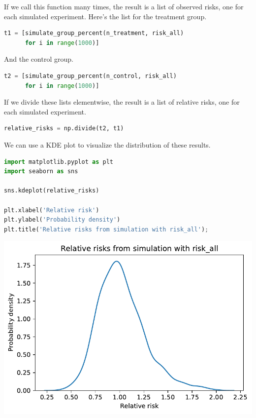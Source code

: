 If we call this function many times, the result is a list of observed
risks, one for each simulated experiment. Here's the list for the
treatment group.

\begin{lstlisting}[language=Python,style=source]
t1 = [simulate_group_percent(n_treatment, risk_all)
      for i in range(1000)]
\end{lstlisting}

And the control group.

\begin{lstlisting}[language=Python,style=source]
t2 = [simulate_group_percent(n_control, risk_all)
      for i in range(1000)]
\end{lstlisting}

If we divide these lists elementwise, the result is a list of relative
risks, one for each simulated experiment.

\begin{lstlisting}[language=Python,style=source]
relative_risks = np.divide(t2, t1)
\end{lstlisting}

We can use a KDE plot to visualize the distribution of these results.

\begin{lstlisting}[language=Python,style=source]
import matplotlib.pyplot as plt
import seaborn as sns

sns.kdeplot(relative_risks)

plt.xlabel('Relative risk')
plt.ylabel('Probability density')
plt.title('Relative risks from simulation with risk_all');
\end{lstlisting}

\begin{center}
\includegraphics[scale=0.75]{13_hypothesis_files/13_hypothesis_28_0.pdf}
\end{center}

